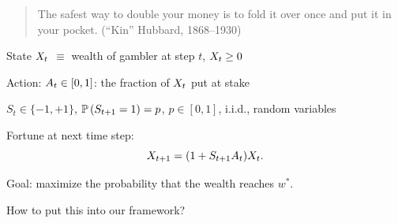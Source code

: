 {
	\begin{quote}
	The safest way to double your money is to fold it over once and put it in your pocket.  (``Kin'' Hubbard, 1868--1930)
	\end{quote}

\bi
\item State $X_t$ $\equiv $ wealth of gambler at step $t$,  $X_t\ge 0$
\item Action: $A_t\in [0,1]$: the fraction of $X_t$ put at stake
\item $S_t\in \{-1,+1\}$, ${\mathbb P}\left(S_{t+1}=1\right) = p$, $p\in [0,1]$, i.i.d., random variables
\item Fortune at next time step:
\[
X_{t+1} = 
(1+S_{t+1}A_t) X_t.
\]
\item \alert{Goal}:  maximize the probability that the wealth reaches $w^*$.
\item How to put this into our framework?
\ei

	

}
